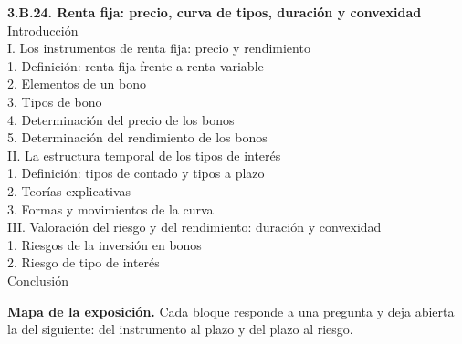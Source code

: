 \documentclass[11pt]{article}
\begin{document}
\begin{esquema}
\textbf{3.B.24. Renta fija: precio, curva de tipos, duración y convexidad}\\[2pt]
Introducción\\
I. Los instrumentos de renta fija: precio y rendimiento\\
\hspace*{1.5em}1. Definición: renta fija frente a renta variable\\
\hspace*{1.5em}2. Elementos de un bono\\
\hspace*{1.5em}3. Tipos de bono\\
\hspace*{1.5em}4. Determinación del precio de los bonos\\
\hspace*{1.5em}5. Determinación del rendimiento de los bonos\\
II. La estructura temporal de los tipos de interés\\
\hspace*{1.5em}1. Definición: tipos de contado y tipos a plazo\\
\hspace*{1.5em}2. Teorías explicativas\\
\hspace*{1.5em}3. Formas y movimientos de la curva\\
III. Valoración del riesgo y del rendimiento: duración y convexidad\\
\hspace*{1.5em}1. Riesgos de la inversión en bonos\\
\hspace*{1.5em}2. Riesgo de tipo de interés\\
Conclusión
\end{esquema}

\begin{anotaciones}
\textbf{Mapa de la exposición.} Cada bloque responde a una pregunta y deja abierta la del siguiente: del instrumento al plazo y del plazo al riesgo.
\begin{infografiacaja}
\caption{Mapa del tema: la pregunta de cada bloque y el hilo que los une}\label{figu:mapa-tema}
\end{infografiacaja}
\end{anotaciones}
\end{document}
